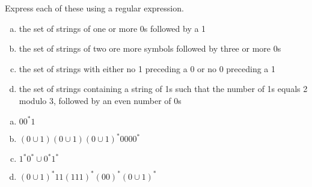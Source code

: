 \documentclass[../main.tex]{subfiles}
\begin{document}
Express each of these using a regular expression.
\begin{enumerate}[a)]
	\item the set of strings of one or more 0s followed by a 1
	\item the set of strings of two ore more symbols followed by three or more 0s
	\item the set of strings with either no 1 preceding a 0 or no 0 preceding a 1
	\item the set of strings containing a string of 1s such that the number of 1s equals 2 modulo 3, followed by an even number of 0s
\end{enumerate}

\solution
\begin{enumerate}[a)]
	\item $00^\ast1$ 
	\item $(0 \cup 1)(0 \cup 1)(0 \cup 1)^\ast0000^\ast$
	\item $1^\ast0^\ast \cup 0^\ast1^\ast$
	\item $(0 \cup 1)^\ast 11(111)^\ast(00)^\ast(0 \cup 1)^\ast$
\end{enumerate}
\end{document}
